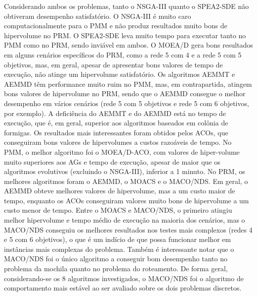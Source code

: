 Considerando ambos os problemas, tanto o NSGA-III quanto o SPEA2-SDE não obtiveram desempenho satisfatório. O NSGA-III é muito caro computacionalmente para o PMM e não produz resultados muito bons de hipervolume no PRM. O SPEA2-SDE leva muito tempo para executar tanto no PMM como no PRM, sendo inviável em ambos. O MOEA/D gera bons resultados em alguns cenários específicos do PRM, como a rede 5 com 4 e a rede 5 com 5 objetivos, mas, em geral, apesar de apresentar bons valores de tempo de execução, não atinge um hipervolume satisfatório. Os algoritmos AEMMT e AEMMD têm performance muito ruim no PMM, mas, em contrapartida, atingem bons valores de hipervolume no PRM, sendo que o AEMMD consegue o melhor desempenho em vários cenários (rede 5 com 5 objetivos e rede 5 com 6 objetivos, por exemplo). A deficiência do AEMMT e do AEMMD está no tempo de execução, que é, em geral, superior aos algoritmos baseados em colônia de formigas. Os resultados mais interessantes foram obtidos pelos ACOs, que conseguiram bons valores de hipervolumes a custos razoáveis de tempo. No PMM, o melhor algoritmo foi o MOEA/D-ACO, com valores de hiper-volume muito superiores aos AGs e tempo de execução, apesar de maior que os algoritmos evolutivos (excluindo o NSGA-III), inferior a 1 minuto. No PRM, os melhores algoritmos foram o AEMMD, o MOACS e o MACO/NDS. Em geral, o AEMMD obteve melhores valores de hipervolume, mas a um custo maior de tempo, enquanto os ACOs conseguiram valores muito bons de hipervolume a um custo menor de tempo. Entre o MOACS e MACO/NDS, o primeiro atingiu melhor hipervolume e tempo médio de execução na maioria dos cenários, mas o MACO/NDS conseguiu os melhores resultados nos testes mais complexos (redes 4 e 5 com 6 objetivos), o que é um indício de que possa funcionar melhor em instâncias mais complexas do problema. Também é interessante notar que o MACO/NDS foi o único algoritmo a conseguir bom desempenho tanto no problema da mochila quanto no problema do roteamento. De forma geral, considerando-se os 8 algoritmos investigados, o MACO/NDS foi o algoritmo de comportamento mais estável ao ser avaliado sobre os dois problemas discretos.
